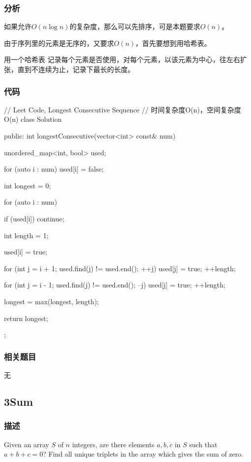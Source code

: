 \subsubsection{分析}
如果允许$O(n \log n)$的复杂度，那么可以先排序，可是本题要求$O(n)$。

由于序列里的元素是无序的，又要求$O(n)$，首先要想到用哈希表。

用一个哈希表 记录每个元素是否使用，对每个元素，以该元素为中心，往左右扩张，直到不连续为止，记录下最长的长度。


\subsubsection{代码}
\begin{Code}
// Leet Code, Longest Consecutive Sequence
// 时间复杂度O(n)，空间复杂度O(n)
class Solution {
public:
    int longestConsecutive(vector<int> const& num) {
        unordered_map<int, bool> used;

        for (auto i : num) used[i] = false;

        int longest = 0;

        for (auto i : num) {
            if (used[i]) continue;

            int length = 1;

            used[i] = true;

            for (int j = i + 1; used.find(j) != used.end(); ++j) {
                used[j] = true;
                ++length;
            }

            for (int j = i - 1; used.find(j) != used.end(); --j) {
                used[j] = true;
                ++length;
            }

            longest = max(longest, length);
        }

        return longest;
    }
};
\end{Code}


\subsubsection{相关题目}
\begindot
\item 无
\myenddot


\subsection{3Sum} %
\label{sec:3sum}


\subsubsection{描述}
Given an array $S$ of $n$ integers, are there elements $a, b, c$ in $S$ such that $a + b + c = 0$? Find all unique triplets in the array which gives the sum of zero.

